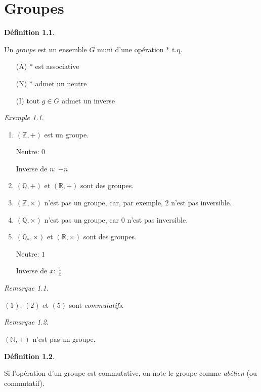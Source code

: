 \documentclass{report}
\newcommand*{\reels}{\mathbb{R}}
\newcommand*{\entiers}{\mathbb{Z}}
\newcommand*{\rationels}{\mathbb{Q}}
\newcommand*{\naturels}{\mathbb{N}}
\theoremstyle{definition}
\newtheorem*{defin}{D\'efinition}
\theoremstyle{remark}
\newtheorem*{exem}{Exemple}
\newtheorem*{rema}{Remarque}
\begin{document}
	\chapter{Groupes}
	\begin{defin}
		~

		Un \emph{groupe} est un ensemble $G$ muni d'une op\'eration $*$ t.q.
		\begin{enumerate}
			\item[(A)] $*$ est associative
			\item[(N)] $*$ admet un neutre
			\item[(I)] tout $g \in G$ admet un inverse
		\end{enumerate}
	\end{defin}
	\begin{exem}
		~

		\begin{enumerate}[label=(\arabic*)]
			\item $(\entiers,+)$ est un groupe.

			Neutre: $0$

			Inverse de $n$: $-n$
			\item $(\rationels,+)$ et $(\reels,+)$ sont des groupes.
			\item $(\entiers,\times)$ n'est pas un groupe, car, par exemple, $2$ n'est pas inversible.
			\item $(\rationels,\times)$ n'est pas un groupe, car $0$ n'est pas inversible.
			\item $(\rationels_*,\times)$ et $(\reels,\times)$ sont des groupes.

			Neutre: $1$

			Inverse de $x$: $\frac{1}{x}$
		\end{enumerate}
		\begin{rema}
			~

			$(1)$, $(2)$ et $(5)$ sont \emph{commutatifs}.
		\end{rema}
		\begin{rema}
			~

			$(\naturels,+)$ n'est pas un groupe.
		\end{rema}
	\end{exem}
	\begin{defin}
		~

		Si l'op\'eration d'un groupe est commutative, on note le groupe comme \emph{ab\'elien} (ou commutatif).
	\end{defin}
\end{document}
